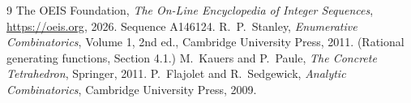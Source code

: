 \documentclass[11pt,a4paper]{article}
\theoremstyle{plain}
\theoremstyle{definition}
\begin{document}
\begin{thebibliography}{9}
 The OEIS Foundation, \emph{The On-Line Encyclopedia of Integer
Sequences}, \url{https://oeis.org}, 2026. Sequence A146124.
 R.~P.~Stanley, \emph{Enumerative Combinatorics}, Volume 1, 2nd ed.,
Cambridge University Press, 2011. (Rational generating functions, Section 4.1.)
 M.~Kauers and P.~Paule, \emph{The Concrete Tetrahedron}, Springer, 2011.
 P.~Flajolet and R.~Sedgewick, \emph{Analytic Combinatorics}, Cambridge
University Press, 2009.
\end{thebibliography}
\end{document}
